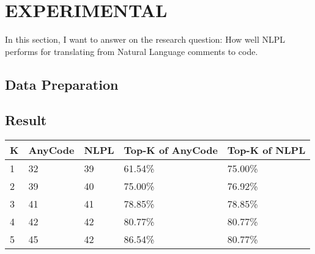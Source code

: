 \chapter{EXPERIMENTAL}
In this section, I want to answer on the research question: How well NLPL performs for translating from Natural Language comments to code.  
\section{Data Preparation}

\section{Result}

\begin{table}[]
	\begin{tabular}{|l|l|l|l|l|}
		\hline
		\textbf{K} & \textbf{AnyCode} & \textbf{NLPL} & \textbf{Top-K of AnyCode} & \textbf{Top-K of NLPL} \\ \hline
		1              & 32               & 39            & 61.54\%                   & 75.00\%                \\ \hline
		2              & 39               & 40            & 75.00\%                   & 76.92\%                \\ \hline
		3              & 41               & 41            & 78.85\%                   & 78.85\%                \\ \hline
		4              & 42               & 42            & 80.77\%                   & 80.77\%                \\ \hline
		5              & 45               & 42            & 86.54\%                   & 80.77\%                \\ \hline
	\end{tabular}
\end{table}

